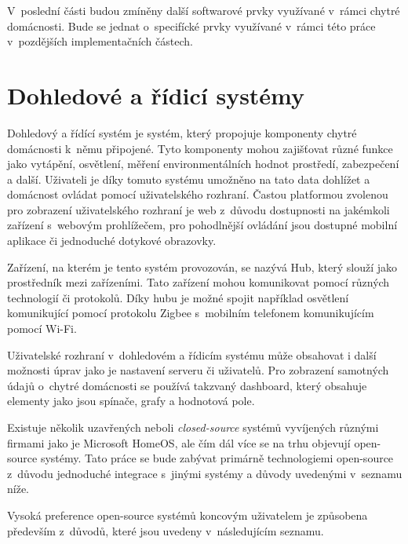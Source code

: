 V~poslední části budou zmíněny další softwarové prvky využívané v~rámci chytré domácnosti. Bude se jednat o~specifícké prvky využívané v~rámci této práce v~pozdějších implementačních částech.

\section{Dohledové a řídicí systémy} \label{systems}
Dohledový a řídící systém je systém, který propojuje komponenty chytré domácnosti k~němu připojené. Tyto komponenty mohou zajišťovat různé funkce jako vytápění, osvětlení, měření environmentálních hodnot prostředí, zabezpečení a další. Uživateli je díky tomuto systému umožněno na tato data dohlížet a domácnost ovládat pomocí uživatelského rozhraní. Častou platformou zvolenou pro zobrazení uživatelského rozhraní je web z~důvodu dostupnosti na jakémkoli zařízení s~webovým prohlížečem, pro pohodlnější ovládání jsou dostupné mobilní aplikace či jednoduché dotykové obrazovky.

Zařízení, na kterém je tento systém provozován, se nazývá Hub, který slouží jako prostředník mezi zařízeními. Tato zařízení mohou komunikovat pomocí různých technologií či protokolů. Díky hubu je možné spojit například osvětlení komunikující pomocí protokolu Zigbee s~mobilním telefonem komunikujícím pomocí Wi-Fi. 

Uživatelské rozhraní v~dohledovém a řídicím systému může obsahovat i další možnosti úprav jako je nastavení serveru či uživatelů. Pro zobrazení samotných údajů o~chytré domácnosti se používá takzvaný dashboard, který obsahuje elementy jako jsou spínače, grafy a hodnotová pole.

Existuje několik uzavřených neboli \emph{closed-source} systémů vyvíjených různými firmami jako je Microsoft HomeOS, ale čím dál více se na trhu objevují open-source systémy. Tato práce se bude zabývat primárně technologiemi open-source z~důvodu jednoduché integrace s~jinými systémy a důvody uvedenými v~seznamu níže.

Vysoká preference open-source systémů koncovým uživatelem je způsobena především z~důvodů, které jsou uvedeny v~následujícím seznamu.

